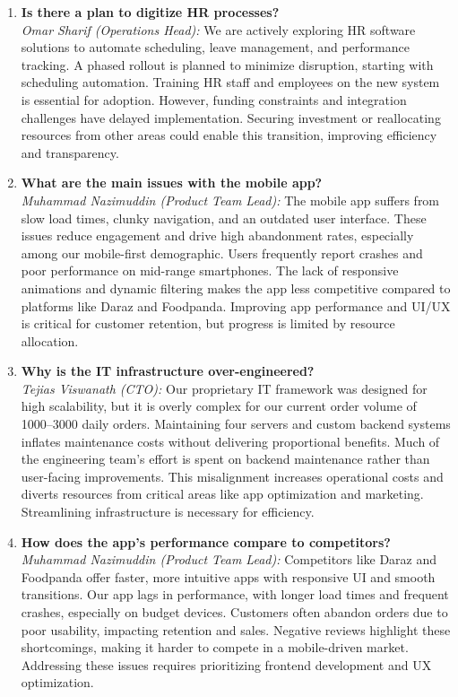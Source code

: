 \documentclass[12pt,a4paper]{article}
\begin{document}
\begin{enumerate}
        \item \textbf{Is there a plan to digitize HR processes?} \\
        \textit{Omar Sharif (Operations Head):} We are actively exploring HR software solutions to automate scheduling, leave management, and performance tracking. A phased rollout is planned to minimize disruption, starting with scheduling automation. Training HR staff and employees on the new system is essential for adoption. However, funding constraints and integration challenges have delayed implementation. Securing investment or reallocating resources from other areas could enable this transition, improving efficiency and transparency.

        \item \textbf{What are the main issues with the mobile app?} \\
        \textit{Muhammad Nazimuddin (Product Team Lead):} The mobile app suffers from slow load times, clunky navigation, and an outdated user interface. These issues reduce engagement and drive high abandonment rates, especially among our mobile-first demographic. Users frequently report crashes and poor performance on mid-range smartphones. The lack of responsive animations and dynamic filtering makes the app less competitive compared to platforms like Daraz and Foodpanda. Improving app performance and UI/UX is critical for customer retention, but progress is limited by resource allocation.

        \item \textbf{Why is the IT infrastructure over-engineered?} \\
        \textit{Tejias Viswanath (CTO):} Our proprietary IT framework was designed for high scalability, but it is overly complex for our current order volume of 1000–3000 daily orders. Maintaining four servers and custom backend systems inflates maintenance costs without delivering proportional benefits. Much of the engineering team’s effort is spent on backend maintenance rather than user-facing improvements. This misalignment increases operational costs and diverts resources from critical areas like app optimization and marketing. Streamlining infrastructure is necessary for efficiency.

        \item \textbf{How does the app’s performance compare to competitors?} \\
        \textit{Muhammad Nazimuddin (Product Team Lead):} Competitors like Daraz and Foodpanda offer faster, more intuitive apps with responsive UI and smooth transitions. Our app lags in performance, with longer load times and frequent crashes, especially on budget devices. Customers often abandon orders due to poor usability, impacting retention and sales. Negative reviews highlight these shortcomings, making it harder to compete in a mobile-driven market. Addressing these issues requires prioritizing frontend development and UX optimization.


\end{enumerate}
\end{document}
